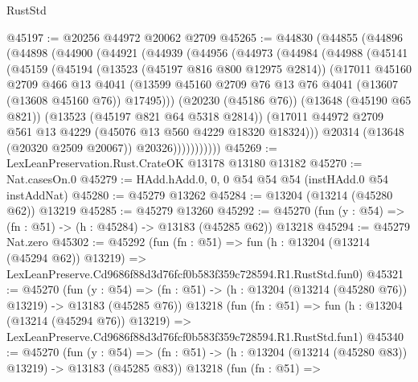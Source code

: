 \begin{lexlean}{RustStd}
\begin{coremodule}
@45197 := @20256 @44972 @20062 @2709
@45265 := @44830
    (@44855
      (@44896
        (@44898
          (@44900
            (@44921
              (@44939
                (@44956
                  (@44973
                    (@44984
                      (@44988
                        (@45141
                          (@45159
                            (@45194
                              (@13523 (@45197 @816 @800 @12975 @2814))
                              (@17011
                                @45160
                                @2709
                                @466
                                @13
                                @4041
                                (@13599
                                  @45160
                                  @2709
                                  @76
                                  @13
                                  @76
                                  @4041
                                  (@13607 (@13608 @45160 @76))
                                  @17495)))
                            (@20230 (@45186 @76))
                            (@13648 (@45190 @65 @821))
                            (@13523 (@45197 @821 @64 @5318 @2814))
                            (@17011
                              @44972
                              @2709
                              @561
                              @13
                              @4229
                              (@45076 @13 @560 @4229 @18320 @18324)))
                          @20314
                          (@13648 (@20320 @2509 @20067))
                          @20326)))))))))))
@45269 := LexLeanPreservation.Rust.CrateOK @13178 @13180 @13182
@45270 := Nat.casesOn.{0}
@45279 := HAdd.hAdd.{0, 0, 0} @54 @54 @54 (instHAdd.{0} @54 instAddNat)
@45280 := @45279 @13262
@45284 := @13204 (@13214 (@45280 @62)) @13219
@45285 := @45279 @13260
@45292 := @45270 (fun (y : @54) => (fn : @51) -> (h : @45284) -> @13183 (@45285 @62)) @13218
@45294 := @45279 Nat.zero
@45302 := @45292
    (fun (fn : @51) =>
    fun (h : @13204 (@13214 (@45294 @62)) @13219) =>
    LexLeanPreserve.Cd9686f88d3d76fcf0b583f359c728594.R1.RustStd.fun0)
@45321 := @45270
    (fun (y : @54) =>
    (fn : @51) -> (h : @13204 (@13214 (@45280 @76)) @13219) -> @13183 (@45285 @76))
    @13218
    (fun (fn : @51) =>
    fun (h : @13204 (@13214 (@45294 @76)) @13219) =>
    LexLeanPreserve.Cd9686f88d3d76fcf0b583f359c728594.R1.RustStd.fun1)
@45340 := @45270
    (fun (y : @54) =>
    (fn : @51) -> (h : @13204 (@13214 (@45280 @83)) @13219) -> @13183 (@45285 @83))
    @13218
    (fun (fn : @51) =>

\end{coremodule}
\end{lexlean}
